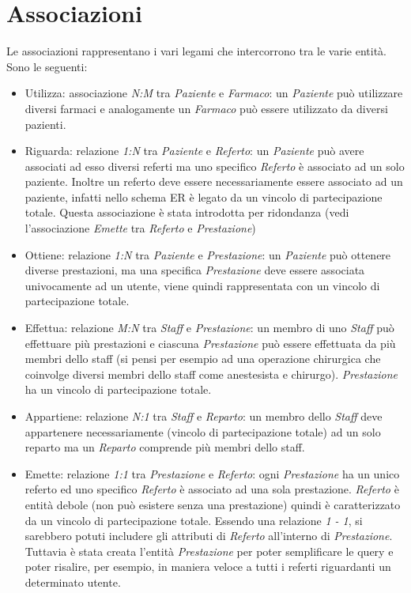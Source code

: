\documentclass[paper=a4, fontsize=11pt,x11names]{report}
\begin{document}
\section{Associazioni}
Le associazioni rappresentano i vari legami che intercorrono tra le varie entità. Sono le seguenti:
\begin{itemize}
\item Utilizza: associazione \textit{N:M} tra \textit{Paziente} e \textit{Farmaco}: un \textit{Paziente} può utilizzare diversi farmaci e analogamente un \textit{Farmaco} può essere utilizzato da diversi pazienti.
\item Riguarda: relazione \textit{1:N} tra \textit{Paziente} e \textit{Referto}: un \textit{Paziente} può avere associati ad esso diversi referti ma uno specifico \textit{Referto} è associato ad un solo paziente. Inoltre un referto deve essere necessariamente essere associato ad un paziente, infatti nello schema ER è legato da un vincolo di partecipazione totale. Questa associazione è stata introdotta per ridondanza (vedi l'associazione \textit{Emette} tra \textit{Referto} e \textit{Prestazione})
\item Ottiene: relazione \textit{1:N} tra \textit{Paziente} e \textit{Prestazione}: un \textit{Paziente} può ottenere diverse prestazioni, ma una specifica \textit{Prestazione} deve essere associata univocamente ad un utente, viene quindi rappresentata con un vincolo di partecipazione totale.
\item Effettua: relazione \textit{M:N} tra \textit{Staff} e \textit{Prestazione}: un membro di uno \textit{Staff} può effettuare più prestazioni e ciascuna \textit{Prestazione} può essere effettuata da più membri dello staff (si pensi per esempio ad una operazione chirurgica che coinvolge diversi membri dello staff come anestesista e chirurgo). \textit{Prestazione} ha un vincolo di partecipazione totale.
\item Appartiene: relazione \textit{N:1} tra \textit{Staff} e \textit{Reparto}: un membro dello \textit{Staff} deve appartenere necessariamente (vincolo di partecipazione totale) ad un solo reparto ma un \textit{Reparto} comprende più membri dello staff.
\item Emette: relazione \textit{1:1} tra \textit{Prestazione} e \textit{Referto}: ogni \textit{Prestazione} ha un unico referto ed uno specifico \textit{Referto} è associato ad una sola prestazione. \textit{Referto} è entità debole (non può esistere senza una prestazione) quindi è caratterizzato da un vincolo di partecipazione totale. Essendo una relazione \textit{1 - 1}, si sarebbero potuti includere gli attributi di \textit{Referto} all'interno di \textit{Prestazione}. Tuttavia è stata creata l'entità \textit{Prestazione} per poter semplificare le query e poter risalire, per esempio, in maniera veloce a tutti i referti riguardanti un determinato utente.

\end{itemize}
\end{document}
